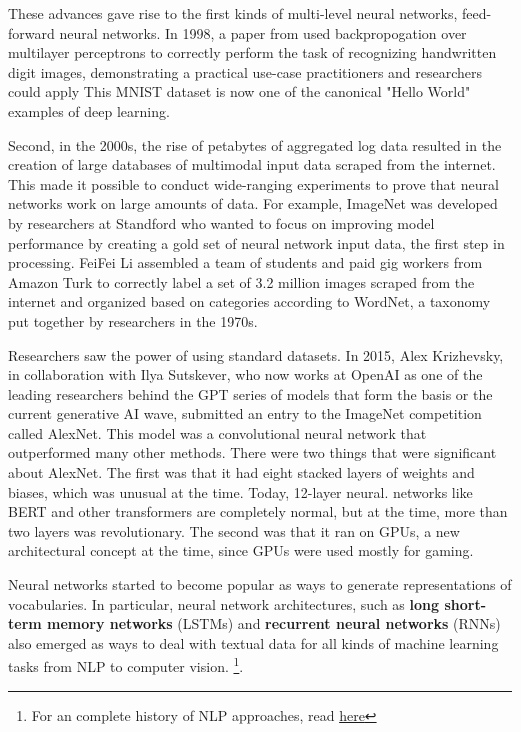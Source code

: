 \documentclass[11pt, table]{diazessay} %
\begin{document}
\begin{sloppypar}
These advances gave rise to the first kinds of multi-level neural networks, feed-forward neural networks. In 1998, a paper from used backpropogation over multilayer perceptrons to correctly perform the task of recognizing handwritten digit images\citep{lecun1998gradient}, demonstrating a practical use-case practitioners and researchers could apply This MNIST dataset is now one of the canonical "Hello World" examples of deep learning. 

Second, in the 2000s, the rise of petabytes of aggregated log data resulted in the creation of large databases of multimodal input data scraped from the internet. This made it possible to conduct wide-ranging experiments to prove that neural networks work on large amounts of data. For example, ImageNet was developed by researchers at Standford who wanted to focus on improving model performance by creating a gold set of neural network input data, the first step in processing. FeiFei Li assembled a team of students and paid gig workers from Amazon Turk to correctly label a set of 3.2 million images scraped from the internet and organized based on categories according to WordNet, a taxonomy put together by researchers in the 1970s\citep{russakovsky2015imagenet}. 

Researchers saw the power of using standard datasets. In 2015, Alex Krizhevsky, in collaboration with Ilya Sutskever, who now works at OpenAI as one of the leading researchers behind the GPT series of models that form the basis or the current generative AI wave, submitted an entry to the ImageNet competition called AlexNet. This model was a convolutional neural network that outperformed many other methods. There were two things that were significant about AlexNet. The first was that it had eight stacked layers of weights and biases, which was unusual at the time. Today, 12-layer neural. networks like BERT and other transformers are completely normal, but at the time, more than two layers was revolutionary. The second was that it ran on GPUs, a new architectural concept at the time, since GPUs were used mostly for gaming. 

Neural networks started to become popular as ways to generate representations of vocabularies. In particular, neural network architectures, such as \textbf{long short-term memory networks} (LSTMs) and \textbf{recurrent neural networks} (RNNs) also emerged as ways to deal with textual data for all kinds of machine learning tasks from NLP to computer vision. \footnote{For an complete history of NLP approaches, read  \href{https://www.ruder.io/a-review-of-the-recent-history-of-nlp/}{here}}. 



\end{sloppypar}
\end{document}
